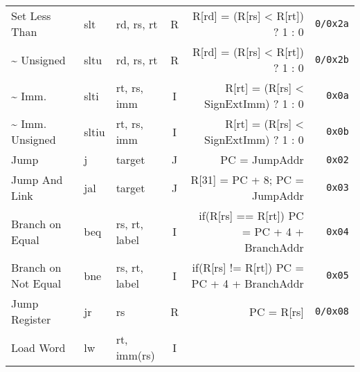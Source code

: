 \begin{tabularx}{\textwidth}{lMAcDr}
    \midrule
    Set Less Than                                                                   & slt    & rd, rs, rt    & R &
    R[rd] = (R[rs] < R[rt]) ? 1 : 0                                                 & \texttt{0/0x2a}                       \\
    \quad\textasciitilde{} Unsigned                                                          & sltu   & rd, rs, rt    & R &
    R[rd] = (R[rs] < R[rt]) ? 1 : 0                \footnotemark[6]                 & \texttt{0/0x2b}                       \\
    \quad\textasciitilde{} Imm.                                                              & slti   & rt, rs, imm   & I &
    R[rt] = (R[rs] < SignExtImm) ? 1 : 0           \footnotemark[2]                 & \texttt{0x0a}                       \\
    \quad\textasciitilde{} Imm. Unsigned                                                     & sltiu  & rt, rs, imm   & I &
    R[rt] = (R[rs] < SignExtImm) ? 1 : 0           \footnotemark[2]\footnotemark[6] & \texttt{0x0b}                       \\
    \midrule
    Jump                                                                            & j      & target        & J &
    PC = JumpAddr                                  \footnotemark[5]                 & \texttt{0x02}                       \\
    Jump And Link                                                                   & jal    & target        & J &
    R[31] = PC + 8; PC = JumpAddr                  \footnotemark[5]                 & \texttt{0x03}                       \\
    Branch on Equal                                                                 & beq    & rs, rt, label & I &
    if(R[rs] == R[rt]) PC = PC + 4 + BranchAddr    \footnotemark[4]                 & \texttt{0x04}                       \\
    Branch on Not Equal                                                             & bne    & rs, rt, label & I &
    if(R[rs] != R[rt]) PC = PC + 4 + BranchAddr    \footnotemark[4]                 & \texttt{0x05}                       \\
    Jump Register                                                                   & jr     & rs            & R &
    PC = R[rs]                                                                      & \texttt{0/0x08}                       \\
    \midrule
    Load Word                                                                       & lw     & rt, imm(rs)   & I &

\end{tabularx}
